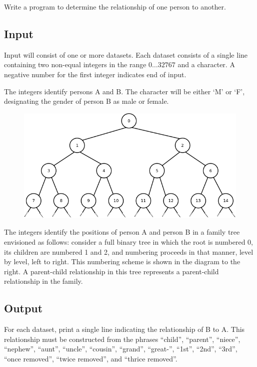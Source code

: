 Write a program to determine the relationship of one person to another.

\subsection*{Input}

Input will consist of one or more datasets. Each dataset consists of a
single line containing two non-equal integers in the range
$0\ldots \num{32767}$ and a character. A negative number for the first
integer indicates end of input.

The integers identify persons A and B. The character will be either
`M' or `F', designating the gender of person B as male or female.

\begin{figure}
\includegraphics[width=\linewidth]{Kinfolk/fullTree.png}
\end{figure}

The integers identify the positions of person A and person B in a
family tree envisioned as follows: consider a full binary tree in
which the root is numbered 0, its children are numbered 1 and 2, and
numbering proceeds in that manner, level by level, left to right. This
numbering scheme is shown in the diagram to the right. A parent-child
relationship in this tree represents a parent-child relationship in
the family.


\subsection*{Output}

For each dataset, print a single line indicating the relationship of B
to A.  This relationship must be constructed from the phrases ``child'',
``parent'', ``niece'', ``nephew'', ``aunt'', ``uncle'', ``cousin'', ``grand'',
``great-'', ``1st'', ``2nd'', ``3rd'', ``once removed'', ``twice removed'', and
``thrice removed''.

